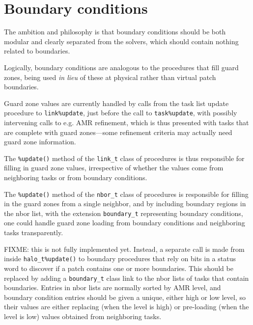 \documentclass[paper=a4,fontsize=11pt]{scrartcl}
\numberwithin{equation}{section}		%
\numberwithin{figure}{section}			%
\numberwithin{table}{section}				%
\newcommand{\codecolor}{\color{Blue}}
\newcommand{\Code}[1]{{\codecolor\texttt{#1}}}
\begin{document}
\section{Boundary conditions}
The ambition and philosophy is that boundary conditions should be both modular and clearly separated from the solvers, which should contain nothing related to boundaries.

Logically, boundary conditions are analogous to the procedures that fill guard zones, being used \textit{in lieu} of these at physical rather than virtual patch boundaries.

Guard zone values are currently handled by calls from the task list update procedure to \Code{link\%update}, just before the call to \Code{task\%update}, with possibly intervening calls to e.g. AMR refinement, which is thus presented with tasks that are complete with guard zones---some refinement criteria may actually need guard zone information.

The \Code{\%update()} method of the \Code{link\_t} class of procedures is thus responsible for filling in guard zone values, irrespective of whether the values come from neighboring tasks or from boundary conditions.

The \Code{\%update()} method of the \Code{nbor\_t} class of procedures is responsible for filling in the guard zones from a single neighbor, and by including boundary regions in the nbor list, with the extension \Code{boundary\_t} representing boundary conditions, one could handle guard zone loading from boundary conditions and neighboring tasks transparently.

FIXME: this is not fully implemented yet. Instead, a separate call is made from inside \Code{halo\_t\%update()} to boundary procedures that rely on bits in a status word to discover if a patch contains one or more boundaries.  This should be replaced by adding a \Code{boundary\_t} class link to the nbor lists of tasks that contain boundaries.  Entries in nbor lists are normally sorted by AMR level, and boundary condition entries should be given a unique, either high or low level, so their values are either replacing (when the level is high) or pre-loading (when the level is low) values obtained from neighboring tasks.

\end{document}

